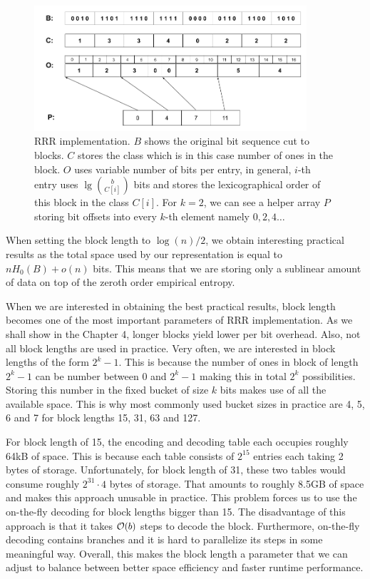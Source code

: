\begin{figure}
	\centerline{
		\includegraphics[width=0.9\textwidth, height=0.3\textheight]{images/rrr}
	}
	\caption[TODO]{RRR implementation. $B$ shows the original bit sequence cut to
    blocks. $C$ stores the class which is in this case number of ones in the block.
    $O$ uses variable number of bits per entry, in general, $i$-th entry uses
    $\lg {b\choose C[i]}$ bits and stores the lexicographical order
    of this block in the class $C[i]$. For $k=2$, we can see a helper array $P$
    storing bit offsets into every $k$-th element namely $0, 2, 4\ldots$
	}
	\label{obr:RRRFinal}
\end{figure}

When setting the block length to $\log(n)/2$, we obtain interesting practical results as
the total space used by our representation is equal to $nH_0(B) + o(n)$ bits. This means
that we are storing only a sublinear amount of data on top of the zeroth order empirical entropy.

When we are interested in obtaining the best practical results, block length becomes
one of the most important parameters of RRR implementation. As we shall show in the Chapter
4, longer blocks yield lower per bit overhead. Also, not all block
lengths are used in practice. Very often, we are interested in block lengths of the form $2^k-1$.
This is because the number of ones in block of length $2^k-1$ can be number between 0 and $2^k-1$
making this in total $2^k$ possibilities. Storing this number in the fixed bucket of size
$k$ bits makes use of all the available space. This is why most commonly used bucket sizes in
practice are 4, 5, 6 and 7 for block lengths 15, 31, 63 and 127.

For block length of 15, the encoding and decoding table each occupies roughly 64kB of space. This
is because each table consists of $2^{15}$ entries each taking 2 bytes of storage. Unfortunately,
for block length of 31, these two tables would consume roughly $2^{31}\cdot 4$ bytes of storage. That
amounts to roughly 8.5GB of space and makes this approach unusable in practice. This problem forces us
to use the on-the-fly decoding for block lengths bigger than 15. The disadvantage of this approach is
that it takes $\mathcal{O}(b)$ steps to decode the block. Furthermore, on-the-fly decoding contains branches
and it is hard to parallelize its steps in some meaningful way. Overall, this makes the block length a
parameter that we can adjust to balance between better space efficiency and faster runtime performance.